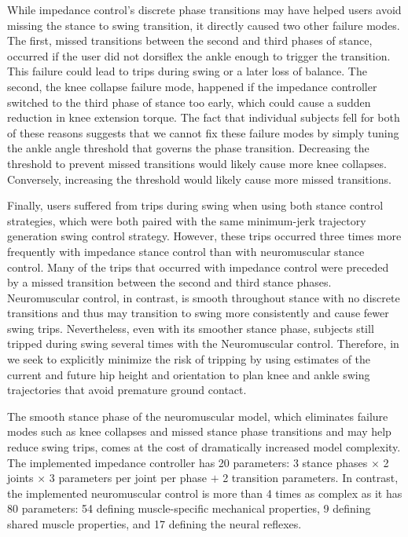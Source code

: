 While impedance control's discrete phase transitions may have helped users avoid
missing the stance to swing transition, it directly caused two other failure
modes. The first, missed transitions between the second and third phases of
stance, occurred if the user did not dorsiflex the ankle enough to trigger the
transition. This failure could lead to trips during swing or a later loss of
balance. The second, the knee collapse failure mode, happened if the impedance
controller switched to the third phase of stance too early, which could cause a
sudden reduction in knee extension torque. The fact that individual subjects
fell for both of these reasons suggests that we cannot fix these failure modes
by simply tuning the ankle angle threshold that governs the phase transition.
Decreasing the threshold to prevent missed transitions would likely cause more
knee collapses. Conversely, increasing the threshold would likely cause more
missed transitions. 

Finally, users suffered from trips during swing when using both stance control
strategies, which were both paired with the same minimum-jerk trajectory
generation swing control strategy. However, these trips occurred three times
more frequently with impedance stance control than with neuromuscular stance
control. Many of the trips that occurred with impedance control were preceded by
a missed transition between the second and third stance phases. Neuromuscular
control, in contrast, is smooth throughout stance with no discrete transitions
and thus may transition to swing more consistently and cause fewer swing trips.
Nevertheless, even with its smoother stance phase, subjects still tripped during
swing several times with the Neuromuscular control. Therefore, in
we seek to explicitly minimize the risk of tripping by using estimates of the
current and future hip height and orientation to plan knee and ankle swing
trajectories that avoid premature ground contact.

The smooth stance phase of the neuromuscular model, which eliminates failure
modes such as knee collapses and missed stance phase transitions and may help
reduce swing trips, comes at the cost of dramatically increased model
complexity. The implemented impedance controller has 20 parameters: 3 stance
phases $\times$ 2 joints $\times$ 3 parameters per joint per phase $+$ 2
transition parameters. In contrast, the implemented neuromuscular control is
more than 4 times as complex as it has 80 parameters: 54 defining
muscle-specific mechanical properties, 9 defining shared muscle properties, and
17 defining the neural reflexes. 

